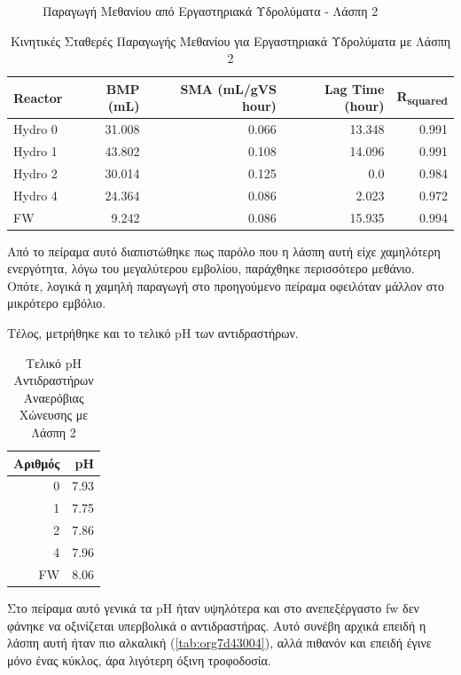 \documentclass[11pt]{report}
\begin{document}
\begin{enumerate}
\begin{figure}[htbp]
\centering

\caption{\label{fig:org204072d}Παραγωγή Μεθανίου από Εργαστηριακά Υδρολύματα - Λάσπη 2}
\end{figure}

\begin{table}[htbp]
\caption{\label{tab:org55d1ba8}Κινητικές Σταθερές Παραγωγής Μεθανίου για Εργαστηριακά Υδρολύματα με Λάσπη 2}
\centering
\begin{tabular}{lrrrr}
Reactor & BMP (mL) & SMA (mL/gVS hour) & Lag Time (hour) & R\textsubscript{squared}\\[0pt]
\hline
Hydro 0 & 31.008 & 0.066 & 13.348 & 0.991\\[0pt]
Hydro 1 & 43.802 & 0.108 & 14.096 & 0.991\\[0pt]
Hydro 2 & 30.014 & 0.125 & 0.0 & 0.984\\[0pt]
Hydro 4 & 24.364 & 0.086 & 2.023 & 0.972\\[0pt]
FW & 9.242 & 0.086 & 15.935 & 0.994\\[0pt]
\end{tabular}
\end{table}

Από το πείραμα αυτό διαπιστώθηκε πως παρόλο που η λάσπη αυτή είχε χαμηλότερη ενεργότητα, λόγω του μεγαλύτερου εμβολίου, παράχθηκε περισσότερο μεθάνιο. Οπότε, λογικά η χαμηλή παραγωγή στο προηγούμενο πείραμα οφειλόταν μάλλον στο μικρότερο εμβόλιο.

Τέλος, μετρήθηκε και το τελικό pH των αντιδραστήρων.

\begin{table}[htbp]
\caption{\label{tab:org165cfda}Τελικό pH Αντιδραστήρων Αναερόβιας Χώνευσης με Λάσπη 2}
\centering
\begin{tabular}{rr}
Αριθμός & pH\\[0pt]
\hline
0 & 7.93\\[0pt]
1 & 7.75\\[0pt]
2 & 7.86\\[0pt]
4 & 7.96\\[0pt]
FW & 8.06\\[0pt]
\end{tabular}
\end{table}

Στο πείραμα αυτό γενικά τα pH ήταν υψηλότερα και στο ανεπεξέργαστο \acrshort{fw} δεν φάνηκε να οξινίζεται υπερβολικά ο αντιδραστήρας. Αυτό συνέβη αρχικά επειδή η λάσπη αυτή ήταν πιο αλκαλική (\ref{tab:org7d43004}), αλλά πιθανόν και επειδή έγινε μόνο ένας κύκλος, άρα λιγότερη όξινη τροφοδοσία.


\end{enumerate}
\end{document}

